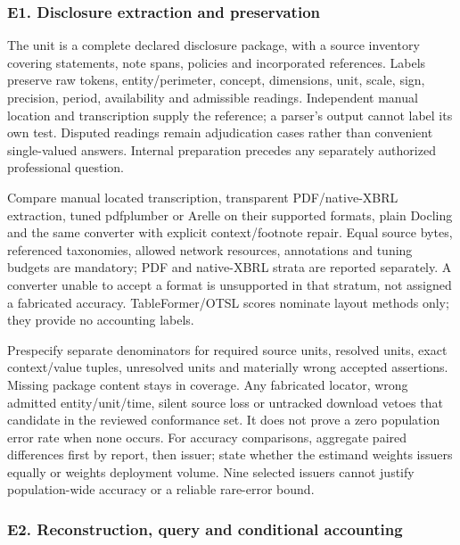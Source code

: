 \hypertarget{e1.-disclosure-extraction-and-preservation}{%
\subsubsection{E1. Disclosure extraction and preservation}\label{e1.-disclosure-extraction-and-preservation}}

The unit is a complete declared disclosure package, with a source inventory covering statements, note spans, policies and incorporated references. Labels preserve raw tokens, entity/perimeter, concept, dimensions, unit, scale, sign, precision, period, availability and admissible readings. Independent manual location and transcription supply the reference; a parser's output cannot label its own test. Disputed readings remain adjudication cases rather than convenient single-valued answers. Internal preparation precedes any separately authorized professional question.

Compare manual located transcription, transparent PDF/native-XBRL extraction, tuned pdfplumber or Arelle on their supported formats, plain Docling and the same converter with explicit context/footnote repair. Equal source bytes, referenced taxonomies, allowed network resources, annotations and tuning budgets are mandatory; PDF and native-XBRL strata are reported separately. A converter unable to accept a format is unsupported in that stratum, not assigned a fabricated accuracy. TableFormer/OTSL scores nominate layout methods only; they provide no accounting labels.

Prespecify separate denominators for required source units, resolved units, exact context/value tuples, unresolved units and materially wrong accepted assertions. Missing package content stays in coverage. Any fabricated locator, wrong admitted entity/unit/time, silent source loss or untracked download vetoes that candidate in the reviewed conformance set. It does not prove a zero population error rate when none occurs. For accuracy comparisons, aggregate paired differences first by report, then issuer; state whether the estimand weights issuers equally or weights deployment volume. Nine selected issuers cannot justify population-wide accuracy or a reliable rare-error bound.

\hypertarget{e2.-reconstruction-query-and-conditional-accounting}{%
\subsubsection{E2. Reconstruction, query and conditional accounting}\label{e2.-reconstruction-query-and-conditional-accounting}}

